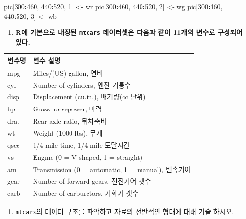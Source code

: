 \documentclass[
  11pt,
]{krantz}
\newenvironment{Shaded}{\begin{snugshade}}{\end{snugshade}}
\newcommand{\DecValTok}[1]{\textcolor[rgb]{0.06,0.06,0.06}{#1}}
\newcommand{\NormalTok}[1]{#1}
\newcommand{\OperatorTok}[1]{\textcolor[rgb]{0.43,0.43,0.43}{\textbf{#1}}}
\newcommand{\StringTok}[1]{\textcolor[rgb]{0.5,0.5,0.5}{#1}}
\providecommand{\tightlist}{%
  \setlength{\itemsep}{0pt}\setlength{\parskip}{0pt}}
\begin{document}
\begin{Shaded}
\begin{Highlighting}[]
\NormalTok{pic[}\DecValTok{300}\OperatorTok{:}\DecValTok{460}\NormalTok{, }\DecValTok{440}\OperatorTok{:}\DecValTok{520}\NormalTok{, }\DecValTok{1}\NormalTok{] <-}\StringTok{ }\NormalTok{wr}
\NormalTok{pic[}\DecValTok{300}\OperatorTok{:}\DecValTok{460}\NormalTok{, }\DecValTok{440}\OperatorTok{:}\DecValTok{520}\NormalTok{, }\DecValTok{2}\NormalTok{] <-}\StringTok{ }\NormalTok{wg}
\NormalTok{pic[}\DecValTok{300}\OperatorTok{:}\DecValTok{460}\NormalTok{, }\DecValTok{440}\OperatorTok{:}\DecValTok{520}\NormalTok{, }\DecValTok{3}\NormalTok{] <-}\StringTok{ }\NormalTok{wb}
\end{Highlighting}
\end{Shaded}

\normalsize

\begin{enumerate}
\def\labelenumi{\arabic{enumi}.}
\setcounter{enumi}{1}
\tightlist
\item
  \textbf{R에 기본으로 내장된 \texttt{mtcars} 데이터셋은 다음과 같이 11개의 변수로 구성되어 있다. }
\end{enumerate}

\footnotesize

\begin{tabular}{l|l}
\hline
변수명 & 변수 설명\\
\hline
mpg & Miles/(US) gallon, 연비\\
\hline
cyl & Number of cylinders, 엔진 기통수\\
\hline
disp & Displacement (cu.in.), 배기량(cc 단위)\\
\hline
hp & Gross horsepower, 마력\\
\hline
drat & Rear axle ratio, 뒤차축비\\
\hline
wt & Weight (1000 lbs), 무게\\
\hline
qsec & 1/4 mile time, 1/4 mile 도달시간\\
\hline
vs & Engine (0 = V-shaped, 1 = straight)\\
\hline
am & Transmission (0 = automatic, 1 = manual), 변속기어\\
\hline
gear & Number of forward gears, 전진기어 갯수\\
\hline
carb & Number of carburetors, 기화기 갯수\\
\hline
\end{tabular}

\normalsize

\begin{enumerate}
\def\labelenumi{\alph{enumi})}
\tightlist
\item
  \texttt{mtcars}의 데이터 구조를 파악하고 자료의 전반적인 형태에 대해 기술 하시오.
\end{enumerate}
\end{document}
